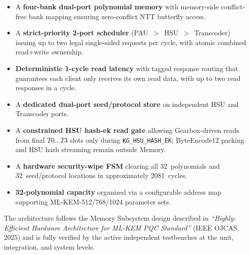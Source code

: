 \documentclass[11pt,letterpaper]{article}
\begin{document}
\begin{itemize}
  \item A \textbf{four-bank dual-port polynomial memory} with memory-side
    conflict-free bank mapping ensuring zero-conflict NTT butterfly
    access.
  \item A \textbf{strict-priority 2-port scheduler} (PAU~$>$~HSU~$>$~Transcoder)
    issuing up to two legal single-sided requests per cycle, with atomic
    combined read+write ownership.
  \item \textbf{Deterministic 1-cycle read latency} with tagged response
    routing that guarantees each client only receives its own read data,
    with up to two read responses in a cycle.
  \item A \textbf{dedicated dual-port seed/protocol store} on independent
    HSU and Transcoder ports.
  \item A \textbf{constrained HSU hash-ek read gate} allowing Gearbox-driven
    reads from final $T0\ldots T3$ slots only during
    \texttt{KG\_HSU\_HASH\_EK}; ByteEncode12 packing and HSU hash streaming
    remain outside Memory.
  \item A \textbf{hardware security-wipe FSM} clearing all 32~polynomials
    and 32~seed/protocol locations in approximately 2081~cycles.
  \item \textbf{32-polynomial capacity} organized via a configurable
    address map supporting ML-KEM-512/768/1024 parameter sets.
\end{itemize}

The architecture follows the Memory Subsystem design described in
\emph{``Highly-Efficient Hardware Architecture for ML-KEM PQC Standard''}
(IEEE OJCAS, 2025) and is fully verified by the active independent testbenches
at the unit, integration, and system levels.
\end{document}
